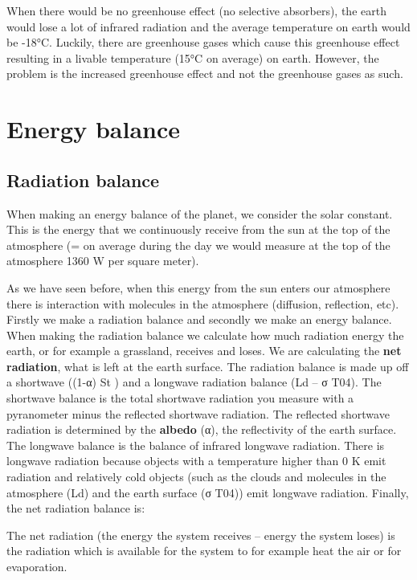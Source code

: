 \documentclass[oneside]{book}
\begin{document}
When there would be no greenhouse effect (no selective absorbers), the
earth would lose a lot of infrared radiation and the average temperature
on earth would be -18°C. Luckily, there are greenhouse gases which cause
this greenhouse effect resulting in a livable temperature (15°C on
average) on earth. However, the problem is the increased greenhouse
effect and not the greenhouse gases as such.

\section{Energy balance}\label{energy-balance}

\subsection{Radiation balance}\label{radiation-balance}

When making an energy balance of the planet, we consider the solar
constant. This is the energy that we continuously receive from the sun
at the top of the atmosphere (= on average during the day we would
measure at the top of the atmosphere 1360 W per square meter).

As we have seen before, when this energy from the sun enters our
atmosphere there is interaction with molecules in the atmosphere
(diffusion, reflection, etc). Firstly we make a radiation balance and
secondly we make an energy balance. When making the radiation balance we
calculate how much radiation energy the earth, or for example a
grassland, receives and loses. We are calculating the \textbf{net
radiation}, what is left at the earth surface. The radiation balance is
made up off a shortwave ((1-α) St ) and a longwave radiation balance (Ld
-- σ T04). The shortwave balance is the total shortwave radiation you
measure with a pyranometer minus the reflected shortwave radiation. The
reflected shortwave radiation is determined by the \textbf{albedo} (α),
the reflectivity of the earth surface. The longwave balance is the
balance of infrared longwave radiation. There is longwave radiation
because objects with a temperature higher than 0 K emit radiation and
relatively cold objects (such as the clouds and molecules in the
atmosphere (Ld) and the earth surface (σ T04)) emit longwave radiation.
Finally, the net radiation balance is:

The net radiation (the energy the system receives -- energy the system
loses) is the radiation which is available for the system to for example
heat the air or for evaporation.
\end{document}
